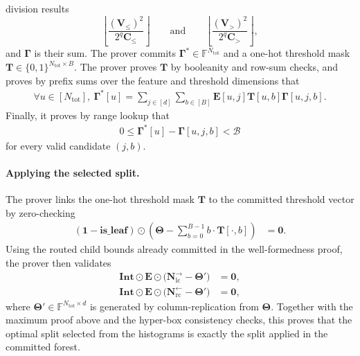 division results
\[
    \left\lfloor
    \frac{(\mathbf{V}_{\leq})^2}{2^q\mathbf{C}_{\leq}}
    \right\rfloor
    \qquad\text{and}\qquad
    \left\lfloor
    \frac{(\mathbf{V}_{>})^2}{2^q\mathbf{C}_{>}}
    \right\rfloor,
\]
and $\boldsymbol{\Gamma}$ is their sum.
The prover commits $\boldsymbol{\Gamma}^{*}\in
\mathbb{F}^{N_{\mathrm{tot}}}$ and a one-hot threshold mask
$\mathbf{T}\in \{0, 1\}^{N_{\mathrm{tot}}\times B}$.
The prover proves $\mathbf{T}$ by booleanity and row-sum checks, and proves
by prefix sums over the feature and threshold dimensions that
\begin{align}
    \forall u\in [N_{\mathrm{tot}}],\ 
    \boldsymbol{\Gamma}^{*}[u]
    =
    \sum_{j\in[d]}\sum_{b\in[B]}
    \mathbf{E}[u,j]\mathbf{T}[u,b]\boldsymbol{\Gamma}[u,j,b].
\end{align}
Finally, it proves by range lookup that
\begin{align}
    0\leq
    \boldsymbol{\Gamma}^{*}[u]
    -
    \boldsymbol{\Gamma}[u,j,b]
    <\mathcal{B}
\end{align}
for every valid candidate $(j,b)$.

\paragraph{Applying the selected split.}
The prover links the one-hot threshold mask $\mathbf{T}$ to the committed threshold vector 
by zero-checking
\begin{align}
    (\mathbf{1}-\mathbf{is\_leaf})\odot
    \left(
    \boldsymbol{\Theta}
    -
    \sum_{b=0}^{B-1} b\cdot\mathbf{T}[\cdot,b]
    \right)
    &=\mathbf{0}.
\end{align}
Using the routed child bounds already committed in the well-formedness proof,
the prover then validates
\begin{align}
    \mathbf{Int}\odot\mathbf{E}\odot
    \bigl(\mathbf{N}^{\rightarrow}_{\mathrm{lc}}-\boldsymbol{\Theta}'\bigr)
    &=\mathbf{0},\\
    \mathbf{Int}\odot\mathbf{E}\odot
    \bigl(\mathbf{N}^{\leftarrow}_{\mathrm{rc}}-\boldsymbol{\Theta}'\bigr)
    &=\mathbf{0},
\end{align}
where $\boldsymbol{\Theta}'\in\mathbb{F}^{N_{\mathrm{tot}}\times d}$ is
generated by column-replication from $\boldsymbol{\Theta}$.
Together with the maximum proof above and the hyper-box consistency checks,
this proves that the optimal split selected from the histograms is exactly the
split applied in the committed forest.

